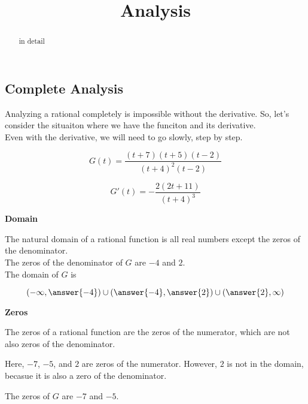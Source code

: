 \documentclass{ximera}
\title{Analysis}
\begin{document}
\begin{abstract}
in detail
\end{abstract}
\maketitle





\subsection*{Complete Analysis}


Analyzing a rational completely is impossible without the derivative. So, let's consider the situaiton where we have the funciton and its derivative. \\

Even with the derivative, we will need to go slowly, step by step.



\[
G(t) = \frac{(t+7)(t+5)(t-2)}{(t+4)^2(t-2)}
\]

\[
G'(t) = -\frac{2(2t+11)}{(t+4)^3}
\]



\textbf{Domain}

\begin{explanation}

The natural domain of a rational function is all real numbers except the zeros of the denominator. \\

The zeros of the denominator of $G$ are $-4$ and $2$. \\


The domain of $G$ is 

\[
\left( -\infty, \answer{-4} \right) \cup \left(\answer{-4}, \answer{2} \right) \cup \left( \answer{2}, \infty \right)
\]


\end{explanation}










\textbf{Zeros}

\begin{explanation}

The zeros of a rational function are the zeros of the numerator, which are not also zeros of the denominator.


Here, $-7$, $-5$, and $2$ are zeros of the numerator.  However, $2$ is not in the domain, becasue it is also a zero of the denominator.


The zeros of $G$ are $-7$ and $-5$.


\end{explanation}
\end{document}
